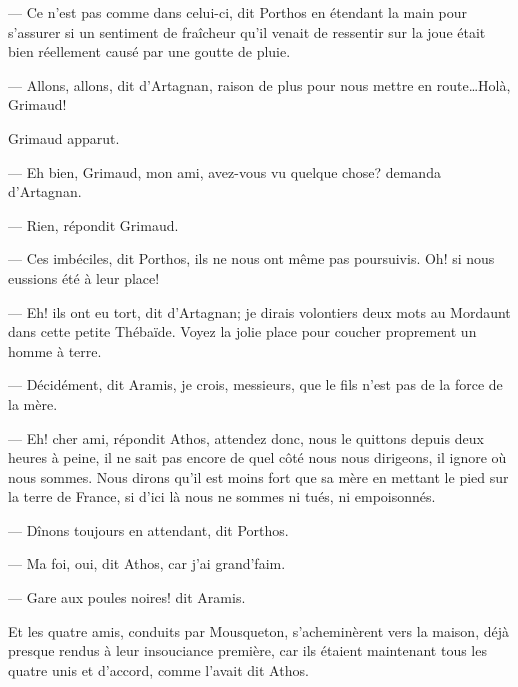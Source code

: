— Ce n'est pas comme dans celui-ci, dit Porthos en étendant la main pour s'assurer si un sentiment de fraîcheur qu'il venait de ressentir sur la joue était bien réellement causé par une goutte de pluie.

— Allons, allons, dit d'Artagnan, raison de plus pour nous mettre en route\dots Holà, Grimaud!

Grimaud apparut.

— Eh bien, Grimaud, mon ami, avez-vous vu quelque chose? demanda d'Artagnan.

— Rien, répondit Grimaud.

— Ces imbéciles, dit Porthos, ils ne nous ont même pas poursuivis. Oh! si nous eussions été à leur place!

— Eh! ils ont eu tort, dit d'Artagnan; je dirais volontiers deux mots au Mordaunt dans cette petite Thébaïde. Voyez la jolie place pour coucher proprement un homme à terre.

— Décidément, dit Aramis, je crois, messieurs, que le fils n'est pas de la force de la mère.

— Eh! cher ami, répondit Athos, attendez donc, nous le quittons depuis deux heures à peine, il ne sait pas encore de quel côté nous nous dirigeons, il ignore où nous sommes. Nous dirons qu'il est moins fort que sa mère en mettant le pied sur la terre de France, si d'ici là nous ne sommes ni tués, ni empoisonnés.

— Dînons toujours en attendant, dit Porthos.

— Ma foi, oui, dit Athos, car j'ai grand'faim.

— Gare aux poules noires! dit Aramis.

Et les quatre amis, conduits par Mousqueton, s'acheminèrent vers la maison, déjà presque rendus à leur insouciance première, car ils étaient maintenant tous les quatre unis et d'accord, comme l'avait dit Athos.